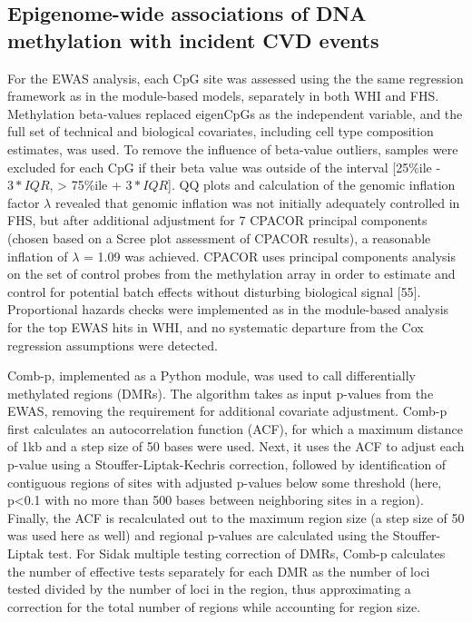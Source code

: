 \documentclass[]{bmcart}
\theoremstyle{definition}
\theoremstyle{definition}
\theoremstyle{definition}
\theoremstyle{remark}
\begin{document}
\subsection{Epigenome-wide associations of DNA methylation with incident
CVD
events}\label{epigenome-wide-associations-of-dna-methylation-with-incident-cvd-events}

For the EWAS analysis, each CpG site was assessed using the the same
regression framework as in the module-based models, separately in both
WHI and FHS. Methylation beta-values replaced eigenCpGs as the
independent variable, and the full set of technical and biological
covariates, including cell type composition estimates, was used. To
remove the influence of beta-value outliers, samples were excluded for
each CpG if their beta value was outside of the interval {[}25\%ile -
\(3*IQR\), \textgreater{} 75\%ile + \(3*IQR\){]}. QQ plots and
calculation of the genomic inflation factor \(\lambda\) revealed that
genomic inflation was not initially adequately controlled in FHS, but
after additional adjustment for 7 CPACOR principal components (chosen
based on a Scree plot assessment of CPACOR results), a reasonable
inflation of \(\lambda\) = 1.09 was achieved. CPACOR uses principal
components analysis on the set of control probes from the methylation
array in order to estimate and control for potential batch effects
without disturbing biological signal {[}55{]}. Proportional hazards
checks were implemented as in the module-based analysis for the top EWAS
hits in WHI, and no systematic departure from the Cox regression
assumptions were detected.

Comb-p, implemented as a Python module, was used to call differentially
methylated regions (DMRs). The algorithm takes as input p-values from
the EWAS, removing the requirement for additional covariate adjustment.
Comb-p first calculates an autocorrelation function (ACF), for which a
maximum distance of 1kb and a step size of 50 bases were used. Next, it
uses the ACF to adjust each p-value using a Stouffer-Liptak-Kechris
correction, followed by identification of contiguous regions of sites
with adjusted p-values below some threshold (here, p\textless{}0.1 with
no more than 500 bases between neighboring sites in a region). Finally,
the ACF is recalculated out to the maximum region size (a step size of
50 was used here as well) and regional p-values are calculated using the
Stouffer-Liptak test. For Sidak multiple testing correction of DMRs,
Comb-p calculates the number of effective tests separately for each DMR
as the number of loci tested divided by the number of loci in the
region, thus approximating a correction for the total number of regions
while accounting for region size.
\end{document}
